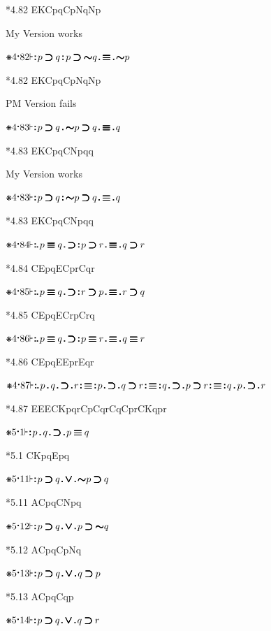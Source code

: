 \documentclass[12pt]{article}
\newcommand{\pmthm}{\mathpunct{\text{\scalebox{.5}[1]{$\boldsymbol\vdash$}}}} %
\newcommand{\pmast}{\text{\resizebox{!}{.75\height}{\ding{107}}}} %
\newcommand{\pmcdot}{\text{\raisebox{.05cm}{$\boldsymbol\cdot$}}} %
\newcommand{\pmd}{\hbox{\rule{.3ex}{.3ex}}} %
\newcommand{\pmdd}{\overset{\pmd}{\pmd}} %
\newcommand{\pmdot}{\mathinner{\pmd}}
\newcommand{\pmdott}{\mathinner{\pmdd}}
\newcommand{\pmdottt}{\mathinner{\pmdd\hspace{1pt}\pmd}}
\newcommand{\pmnot}{\mathord{\ooalign{$\boldsymbol{\sim}\mkern.5mu$\hidewidth\cr$\boldsymbol{\sim}$\cr\hidewidth$\mkern.5mu\boldsymbol{\sim}$}}}
\newcommand{\pmor}{\mathbin{\ooalign{$\boldsymbol{\vee}\mkern.5mu$\hidewidth\cr$\boldsymbol{\vee}$\cr\hidewidth$\mkern.5mu\boldsymbol{\vee}$}}}
\newcommand{\pmimp}{\mathbin{\ooalign{$\boldsymbol{\supset}\mkern.5mu$\hidewidth\cr$\boldsymbol{\supset}$\cr\hidewidth$\mkern.5mu\boldsymbol{\supset}$}}} %
\newcommand{\pmand}{\mathbin{\pmd}}%
\newcommand{\pmandd}{\mathbin{\pmdd}}
\newcommand{\pmiff}{\mathbin{\ooalign{$\boldsymbol{\equiv}\mkern.5mu$\hidewidth\cr$\boldsymbol{\equiv}$\cr\hidewidth$\mkern.5mu\boldsymbol{\equiv}$}}} %
\begin{document}
*4.82 EKCpqCpNqNp

My Version works

$\pmast 4 \pmcdot 82 \pmthm \pmdott p \pmimp q \pmandd p \pmimp \pmnot q \pmdot \pmiff \pmdot \pmnot p $

*4.82 EKCpqCpNqNp

PM Version fails

$\pmast 4 \pmcdot 83 \pmthm \pmdott p \pmimp q \pmand \pmnot p \pmimp q \pmdot \pmiff \pmdot q $

*4.83 EKCpqCNpqq

My Version works

$\pmast 4 \pmcdot 83 \pmthm \pmdott p \pmimp q \pmandd \pmnot p \pmimp q \pmdot \pmiff \pmdot q $

*4.83 EKCpqCNpqq

$\pmast 4 \pmcdot 84 \pmthm \pmdottt p \pmiff q \pmdot \pmimp \pmdott p \pmimp r \pmdot \pmiff \pmdot q \pmimp r $

*4.84 CEpqECprCqr

$\pmast 4 \pmcdot 85 \pmthm \pmdottt p \pmiff q \pmdot \pmimp \pmdott r \pmimp p \pmdot \pmiff \pmdot r \pmimp q $

*4.85 CEpqECrpCrq

$\pmast 4 \pmcdot 86 \pmthm \pmdottt p \pmiff q \pmdot \pmimp \pmdott p \pmiff r \pmdot \pmiff \pmdot q \pmiff r $

*4.86 CEpqEEprEqr

$\pmast 4 \pmcdot 87 \pmthm \pmdottt p \pmand q \pmdot \pmimp \pmdot r \pmdott \pmiff \pmdott p \pmdot \pmimp \pmdot q \pmimp r \pmdott \pmiff \pmdott q \pmdot \pmimp \pmdot p \pmimp r \pmdott \pmiff \pmdott q \pmand p \pmdot \pmimp \pmdot r$

*4.87 EEECKpqrCpCqrCqCprCKqpr

$\pmast 5 \pmcdot 1 \pmthm \pmdott p \pmand q \pmdot \pmimp \pmdot p \pmiff q $

*5.1 CKpqEpq

$\pmast 5 \pmcdot 11 \pmthm \pmdott p \pmimp q \pmdot \pmor \pmdot \pmnot p \pmimp q $

*5.11 ACpqCNpq

$\pmast 5 \pmcdot 12 \pmthm \pmdott p \pmimp q \pmdot \pmor \pmdot p \pmimp \pmnot q $

*5.12 ACpqCpNq

$\pmast 5 \pmcdot 13 \pmthm \pmdott p \pmimp q \pmdot \pmor \pmdot q \pmimp p $

*5.13 ACpqCqp

$\pmast 5 \pmcdot 14 \pmthm \pmdott p \pmimp q \pmdot \pmor \pmdot q \pmimp r $
\end{document}

